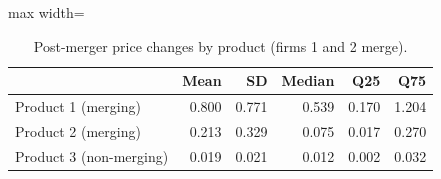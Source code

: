 \begin{table}[H]
\centering\small
\caption{Post-merger price changes by product (firms 1 and 2 merge).}\label{tab:q10b_dp}
\begin{adjustbox}{max width=\linewidth}
\begin{tabular}{lrrrrr}
\toprule
 & Mean & SD & Median & Q25 & Q75 \\
\midrule
Product 1 (merging) & 0.800 & 0.771 & 0.539 & 0.170 & 1.204 \\
Product 2 (merging) & 0.213 & 0.329 & 0.075 & 0.017 & 0.270 \\
Product 3 (non-merging) & 0.019 & 0.021 & 0.012 & 0.002 & 0.032 \\
\bottomrule
\end{tabular}
\end{adjustbox}
\par\vspace{3pt}{\footnotesize Post-merger minus pre-merger equilibrium price, over the 100 markets (currency units).}
\end{table}
